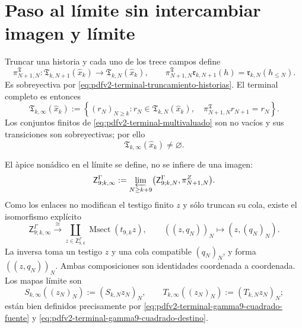 \section{Paso al l\'imite sin intercambiar imagen y l\'imite}

Truncar una historia y cada uno de los trece campos define
\begin{equation}
\label{eq:pdfv2-terminal-transicion-horizonte}
 \pi^{\mathfrak T}_{N+1,N}:
 \mathfrak T_{k,N+1}(\widehat x_k)\longrightarrow
 \mathfrak T_{k,N}(\widehat x_k),
 \qquad
 \pi^{\mathfrak T}_{N+1,N}\mathfrak r_{k,N+1}(h)
 =\mathfrak r_{k,N}(h_{\leq N}).
\end{equation}
Es sobreyectiva por
\eqref{eq:pdfv2-terminal-truncamiento-historias}. El terminal completo es
entonces
\begin{equation}
\label{eq:pdfv2-terminal-limite-inverso}
 \mathfrak T_{k,\infty}(\widehat x_k)
 :=\left\{(r_N)_{N\geq k}:
 r_N\in\mathfrak T_{k,N}(\widehat x_k),\quad
 \pi^{\mathfrak T}_{N+1,N}r_{N+1}=r_N\right\}.
\end{equation}
Los conjuntos finitos de
\eqref{eq:pdfv2-terminal-multivaluado} son no vac\'ios y sus transiciones
son sobreyectivas; por ello
\begin{equation}
\label{eq:pdfv2-terminal-limite-no-vacio}
 \mathfrak T_{k,\infty}(\widehat x_k)\neq\varnothing.
\end{equation}

El \`apice non\'adico en el l\'imite se define, no se infiere de una imagen:
\begin{equation}
\label{eq:pdfv2-terminal-gamma9-apice-limite-raw}
 \mathsf Z^\Gamma_{9;k,\infty}
 :=\varprojlim_{N\geq k+9}
 \bigl(\mathsf Z^\Gamma_{9;k,N},\pi^Z_{N+1,N}\bigr).
\end{equation}
Como los enlaces no modifican el testigo finito \(z\) y s\'olo truncan su
cola, existe el isomorfismo expl\'icito
\begin{equation}
\label{eq:pdfv2-terminal-gamma9-apice-limite-msect}
 \mathsf Z^\Gamma_{9;k,\infty}
 \xrightarrow{\ \cong\ }
 \coprod_{z\in\mathsf Z^\Gamma_{9,k}}
 \operatorname{Msect}(t_{9,k}z),\qquad
 ((z,q_N))_N\longmapsto(z,(q_N)_N).
\end{equation}
La inversa toma un testigo \(z\) y una cola compatible \((q_N)_N\), y forma
\(((z,q_N))_N\). Ambas composiciones son identidades coordenada a
coordenada. Los mapas l\'imite son
\begin{equation}
\label{eq:pdfv2-terminal-gamma9-mapas-limite-raw}
 S_{k,\infty}((z_N)_N):=(S_{k,N}z_N)_N,\qquad
 T_{k,\infty}((z_N)_N):=(T_{k,N}z_N)_N;
\end{equation}
est\'an bien definidos precisamente por
\eqref{eq:pdfv2-terminal-gamma9-cuadrado-fuente} y
\eqref{eq:pdfv2-terminal-gamma9-cuadrado-destino}.

